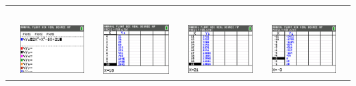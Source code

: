 \documentclass{ximera}
\begin{document}
\begin{example}
{\setscreens
\begin{tabularx}{\linewidth}{LGsGsGsGR}
&  && \,\,\GRM{\veetext} && \GRM{\veetext} && \GRM{\wedgetext}\\[0.2cm]
&
{\includegraphics[width=\widthscreens]{screen01}}
&&
{\includegraphics[width=\widthscreens]{screen02}}
&&
{\includegraphics[width=\widthscreens]{screen03}}
&&
{\includegraphics[width=\widthscreens]{screen04}}
&
\end{tabularx}
\setlength{\tabcolsep}{6pt}
}
\end{example}
\end{document}
